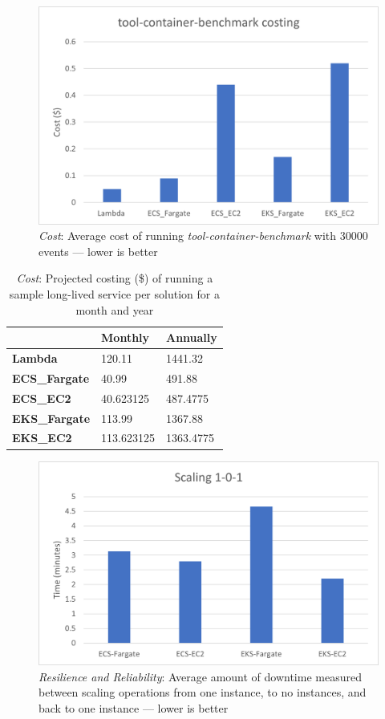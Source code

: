 \begin{figure}[hp]
  \includegraphics{images/cost-workload.png}
  \caption{\emph{Cost}: Average cost of running \emph{tool-container-benchmark} with 30000 events --- lower is better}
  \label{fig:cost_workload}
\end{figure}

\begin{table}[hp]
  \caption{\emph{Cost}: Projected costing (\$) of running a sample long-lived service per solution for a month and year}
  \small
  \begin{tabularx}{1\textwidth}{X | X | X }
    \space            & \bf{Monthly} & \bf{Annually} \\
    \hline
    \bf{Lambda      } & 120.11       & 1441.32       \\
    \bf{ECS\_Fargate} & 40.99        & 491.88        \\
    \bf{ECS\_EC2    } & 40.623125    & 487.4775      \\
    \bf{EKS\_Fargate} & 113.99       & 1367.88       \\
    \bf{EKS\_EC2    } & 113.623125   & 1363.4775     \\
  \end{tabularx}
  \label{fig:cost_projected}
\end{table}

\begin{figure}[hp]
  \includegraphics{images/rr-scaling.png}
  \caption{\emph{Resilience and Reliability}: Average amount of downtime measured between scaling operations from one instance, to no instances, and back to one instance --- lower is better}
  \label{fig:rr_scaling}
\end{figure}

